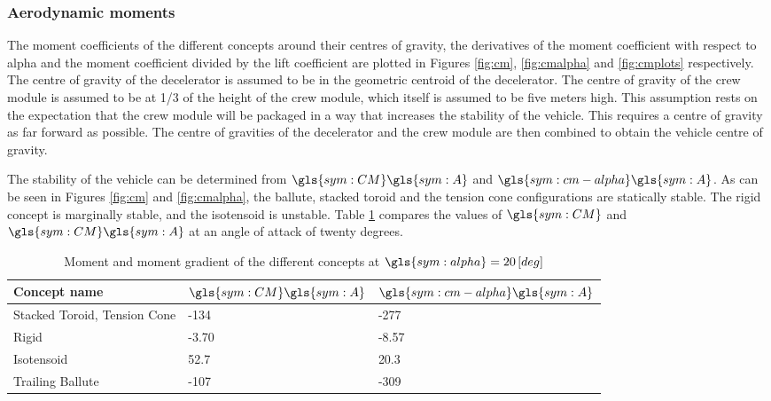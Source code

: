 \subsubsection{Aerodynamic moments}
The moment coefficients of the different concepts around their centres of gravity, the derivatives of the moment coefficient with respect to alpha and the moment coefficient divided by the lift coefficient are plotted in Figures \ref{fig:cm}, \ref{fig:cmalpha} and \ref{fig:cmplots} respectively. The centre of gravity of the decelerator is assumed to be in the geometric centroid of the decelerator. The centre of gravity of the crew module is assumed to be at 1/3 of the height of the crew module, which itself is assumed to be five meters high. This assumption rests on the expectation that the crew module will be packaged in a way that increases the stability of the vehicle. This requires a centre of gravity as far forward as possible. The centre of gravities of the decelerator and the crew module are then combined to obtain the vehicle centre of gravity. 

The stability of the vehicle can be determined from $\gls{sym:CM}\gls{sym:A}$ and $\gls{sym:cm-alpha}\gls{sym:A}$. As can be seen in Figures \ref{fig:cm} and \ref{fig:cmalpha}, the ballute, stacked toroid and the tension cone configurations are statically stable. The rigid concept is marginally stable, and the isotensoid is unstable. Table \ref{tab:MomentCoeff} compares the values of $\gls{sym:CM}$ and $\gls{sym:CM}\gls{sym:A}$ at an angle of attack of twenty degrees. 
 
\begin{table}[H]
	\caption{Moment and moment gradient of the different concepts at $\gls{sym:alpha}=20 \left[deg\right]$}%
	\label{tab:MomentCoeff}%
	\begin{tabular}{|p{}|p{}|p{}|}
		\hline
		Concept name  					& $\gls{sym:CM}\gls{sym:A}$	& $\gls{sym:cm-alpha}\gls{sym:A}$	\\ \hline \hline
		Stacked Toroid, Tension Cone	& -134    		& -277				\\ \hline
		Rigid  							& -3.70			& -8.57				\\ \hline
		Isotensoid  					& 52.7				& 20.3				\\ \hline
		Trailing Ballute				& -107			& -309				\\ \hline				
	\end{tabular}
\end{table} 
 
